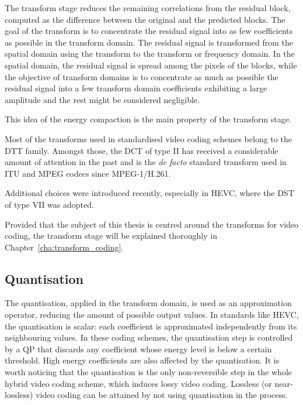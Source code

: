 \documentclass[11pt,a4paper,openright,twoside]{book}
\numberwithin{equation}{section} %
\numberwithin{figure}{section} %
\numberwithin{table}{section} %
\begin{document}
The transform stage reduces the remaining correlations from the residual
block, computed as the difference between the original and the predicted
blocks.
The goal of the transform is to concentrate the residual signal into as few
coefficients as possible in the transform domain.
The residual signal is transformed from the spatial domain using the
transform to the transform or frequency domain.
In the spatial domain, the residual signal is spread among the pixels of the
blocks, while the objective of transform domains is to concentrate as much as
possible the residual signal into a few transform domain coefficients
exhibiting a large amplitude and the rest might be considered negligible.

This idea of the energy compaction is the main property of the transform
stage.

Most of the transforms used in standardised video coding schemes belong to the
\ac{DTT} family.
Amongst those, the \ac{DCT} of type II has received a considerable amount of
attention in the past and is the \emph{de facto} standard transform used in
\acs{ITU} and \acs{MPEG} codecs since \acs{MPEG}-1/H.261.

Additional choices were introduced recently, especially in \ac{HEVC}, where
the \ac{DST} of type VII was adopted.

Provided that the subject of this thesis is centred around the
transforms for video coding, the transform stage will be explained
thoroughly in Chapter~\ref{cha:transform_coding}.

\subsection{Quantisation}
\label{sub:quantisation}

The quantisation, applied in the transform domain, is used as an approximation
operator, reducing the amount of possible output values.
In standards like \ac{HEVC}, the quantisation is scalar:
each coefficient is approximated independently from its neighbouring values.
In these coding schemes, the quantisation step is controlled by a \ac{QP} that
discards any coefficient whose energy level is below a certain threshold.
High energy coefficients are also affected by the quantisation.
It is worth noticing that the quantisation is the only non-reversible step in
the whole hybrid video coding scheme, which induces lossy video coding.
Lossless (or near-lossless) video coding can be attained by not using
quantisation in the process.
\end{document}
